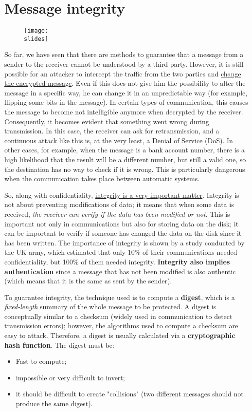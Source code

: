 \section{Message integrity}
\begin{figure}[h]
    \centering
    \texttt{[image: \\slides]}
\end{figure}

So far, we have seen that there are methods to guarantee that a message from a sender to the receiver cannot be understood by a third party. However, it is still possible for an attacker to intercept the traffic from the two parties and \underline{change the encrypted message}.
Even if this does not give him the possibility to alter the message in a specific way, he can change it in an unpredictable way (for example, flipping some bits in the message).
In certain types of communication, this causes the message to become not intelligible anymore when decrypted by the receiver.
Consequently, it becomes evident that something went wrong during transmission. In this case, the receiver can ask for retransmission, and a continuous attack like this is, at the very least, a Denial of Service (DoS).
In other cases, for example, when the message is a bank account number, there is a high likelihood that the result will be a different number, but still a valid one, so the destination has no way to check if it is wrong.
This is particularly dangerous when the communication takes place between automatic systems.

So, along with confidentiality, \underline{integrity is a very important matter}. Integrity is not about preventing modifications of data; it means that when some data is received, \textit{the receiver can verify if the data has been modified or not}. This is important not only in communications but also for storing data on the disk; it can be important to verify if someone has changed the data on the disk since it has been written.
The importance of integrity is shown by a study conducted by the UK army, which estimated that only 10\% of their communications needed confidentiality, but 100\% of them needed integrity. \textbf{Integrity also implies authentication} since a message that has not been modified is also authentic (which means that it is the same as sent by the sender).

To guarantee integrity, the technique used is to compute a \textbf{digest}, which is a \textit{fixed-length} summary of the whole message to be protected. A digest is conceptually similar to a checksum (widely used in communication to detect transmission errors); however, the algorithms used to compute a checksum are easy to attack. Therefore, a digest is usually calculated via a \textbf{cryptographic hash function}. The digest must be:
\begin{itemize}
    \item Fast to compute;
    \item impossible or very difficult to invert;
    \item it should be difficult to create "collisions" (two different messages should not produce the same
          digest).
\end{itemize}

